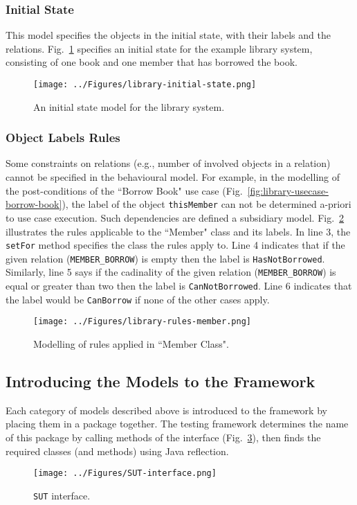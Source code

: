 \subsubsection{Initial State}
\label{sec:subsidiary-models-initial-state}
This model specifies the objects in the initial state, with their labels and the relations. Fig.~\ref{fig:library-initial-state} specifies an initial state for the example library system, consisting of one book and one member that has borrowed the book.

\begin{figure}[h]
\centering
\texttt{[image: ../Figures/library-initial-state.png]}
\caption{An initial state model for the library system.}
\label{fig:library-initial-state}
\end{figure}

\subsubsection{Object Labels Rules}
\label{sec:subsidiary-models-object-labels}
Some constraints on relations (e.g., number of involved objects in a relation) cannot be specified in the behavioural model. For example, in the modelling of the post-conditions of the ``Borrow Book" use case (Fig.~\ref{fig:library-usecase-borrow-book}), the label of the object \texttt{thisMember} can not be determined a-priori to use case execution. 
Such dependencies are defined a subsidiary model. Fig.~\ref{fig:library-rules-member} illustrates the rules applicable to the ``Member" class and its labels. In line 3, the \texttt{setFor} method specifies the class the rules apply to. Line 4 indicates that if the given relation (\texttt{MEMBER\_BORROW}) is empty then the label is \texttt{HasNotBorrowed}. Similarly, line 5 says if the cadinality of the given relation (\texttt{MEMBER\_BORROW}) is equal or greater than two then the label is \texttt{CanNotBorrowed}. Line 6 indicates that the label would be \texttt{CanBorrow} if none of the other cases apply.

\begin{figure}[h]
\centering
\texttt{[image: ../Figures/library-rules-member.png]}
\caption{Modelling of rules applied in ``Member Class".}
\label{fig:library-rules-member}
\end{figure}

\subsection{Introducing the Models to the Framework}
\label{sec:create-test model-introducing-models}
Each category of models described above is introduced to the framework by placing them in a package together.
The testing framework determines the name of this package by calling methods of the  interface (Fig.~\ref{fig:SUT-interface}), then finds the required classes (and methods) using Java reflection.

\begin{figure}[h]
\centering
\texttt{[image: ../Figures/SUT-interface.png]}
\caption{\texttt{SUT} interface.}
\label{fig:SUT-interface}
\end{figure}
